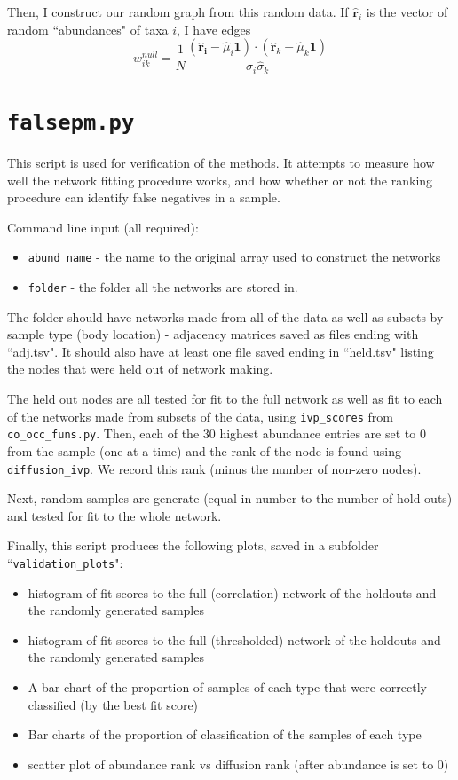 \documentclass[10pt]{article}
\theoremstyle{definition}
\numberwithin{theorem}{section}
\numberwithin{definition}{section}
\numberwithin{lemma}{section}
\numberwithin{corollary}{section}
\numberwithin{clm}{section}
\numberwithin{rmk}{section}
\renewcommand{\b}{\bm}
\begin{document}
Then, I construct our random graph from this random data. If $\hat{\b{r}}_i$ is the vector of random ``abundances" of taxa $i$, I have edges
\[
w_{ik}^{null} = \frac{1}{N}\frac{(\b{\hat{\b{r}}_i}- \hat{\mu}_i\b{1}) \cdot (\hat{\b{r}}_k - \hat{\mu}_k\b{1})}{\hat{\sigma}_i \hat{\sigma}_k}
\]

\cprotect \section{\verb|falsepm.py|}

This script is used for verification of the methods. It attempts to measure how well the network fitting procedure works, and how whether or not the ranking procedure can identify false negatives in a sample.

Command line input (all required):
\begin{itemize}
	\item \verb|abund_name| - the name to the original array used to construct the networks
	\item \verb|folder| - the folder all the networks are stored in.
\end{itemize}

The folder should have networks made from all of the data as well as subsets by sample type (body location) - adjacency matrices saved as files ending with ``adj.tsv". It should also have at least one file saved ending in ``held.tsv" listing the nodes that were held out of network making. 

The held out nodes are all tested for fit to the full network as well as fit to each of the networks made from subsets of the data, using \verb|ivp_scores| from \verb|co_occ_funs.py|. Then, each of the 30 highest abundance entries are set to 0 from the sample (one at a time) and the rank of the node is found using \verb|diffusion_ivp|. We record this rank (minus the number of non-zero nodes). 

Next, random samples are generate (equal in number to the number of hold outs) and tested for fit to the whole network. 

Finally, this script produces the following plots, saved in a subfolder ``\verb|validation_plots|":
\begin{itemize}
	\item histogram of fit scores to the full (correlation) network of the holdouts and the randomly generated samples
	\item histogram of fit scores to the full (thresholded) network of the holdouts and the randomly generated samples
	\item A bar chart of the proportion of samples of each type that were correctly classified (by the best fit score)
	\item Bar charts of the proportion of classification of the samples of each type
	\item scatter plot of abundance rank vs diffusion rank (after abundance is set to 0)
\end{itemize}
\end{document}
